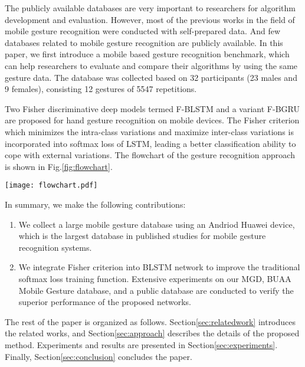 \documentclass[review]{elsarticle}
\begin{document}
The publicly available databases are very important to researchers for algorithm development and evaluation. However, most of the previous works in the field of mobile gesture recognition were conducted with self-prepared data. And few databases related to mobile gesture recognition are publicly available. In this paper, we first introduce a mobile based gesture recognition benchmark, which can help researchers to evaluate and compare their algorithms by using the same gesture data. The database was collected based on 32 participants (23 males and 9 females), consisting 12 gestures of 5547 repetitions.

Two Fisher discriminative deep models termed F-BLSTM and a variant F-BGRU are proposed for hand gesture recognition on mobile devices.
The Fisher criterion which minimizes the {intra-class variations and maximize inter-class variations} is incorporated into softmax loss of LSTM, leading a better classification ability to cope with external variations. The flowchart of the gesture recognition approach is shown in Fig.\;\ref{fig:flowchart}.


\begin{figure*}[t]
	\normalsize
	\centering
	\texttt{[image: flowchart.pdf]}
	\caption{Flowchart of the gesture recognition system. We introduce Fisher criterion into BLSTM network to improve the traditional softmax loss training function, which is able to minimize the intra-class variations and maximize the inter-class variations in the deep framework. }
	\label{fig:flowchart}%
\end{figure*}

In summary, we make the following contributions:

\begin{enumerate}[1.]
	\item We collect a large mobile gesture database using an Andriod {Huawei} device, which is the largest database in published studies for mobile gesture recognition systems.
	\item We integrate Fisher criterion into BLSTM network to improve the traditional softmax loss training function. Extensive experiments on our {MGD, BUAA Mobile Gesture database,} and a public database are conducted to verify the superior performance of the proposed networks.
\end{enumerate}

The rest of the paper is organized as follows. Section\;\ref{sec:relatedwork} introduces the related works, and Section\;\ref{sec:approach} describes the details of the proposed method. Experiments and results are presented in Section\;\ref{sec:experiments}. Finally, Section\;\ref{sec:conclusion} concludes the paper.
\end{document}
